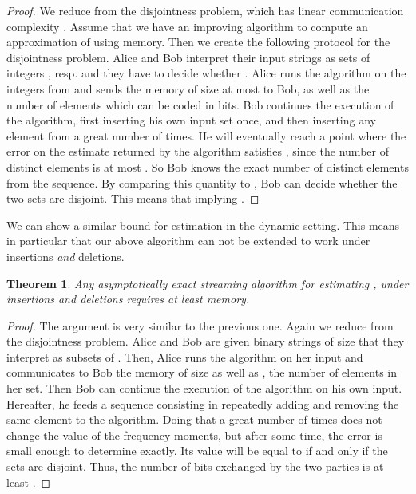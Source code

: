 \documentclass[a4paper,11pt,oneside,english,onecolumn]{article}
\newtheorem{theorem}{Theorem}
\theoremstyle{definition}
\begin{document}
\begin{proof}
We reduce from the disjointness problem, which has linear communication complexity \cite{Disjointness}. Assume that we have an improving algorithm  to compute an approximation of  using  memory. Then we create the following protocol for the disjointness problem. Alice and Bob interpret their input strings  as sets of integers , resp.  and they have to decide whether . Alice runs the algorithm on the integers from  and sends the memory of size at most  to Bob, as well as the number of elements  which can be coded in  bits. Bob continues the execution of the algorithm, first inserting his own input set  once, and then inserting any element from  a great number of times. He will eventually reach a point where the error on the estimate  returned by the algorithm satisfies , since the number of distinct elements is at most . So Bob knows the exact number of distinct elements from the sequence. By comparing this quantity to , Bob can decide whether the two sets are disjoint. This means that  implying .
\end{proof}

We can show a similar bound for  estimation in the dynamic setting. This means in particular that our above algorithm can not be extended to work under insertions \emph{and} deletions.

\begin{theorem}
\label{lem:fk}
Any asymptotically exact streaming algorithm for estimating ,  under insertions and deletions requires at least  memory.
\end{theorem}

\begin{proof}
The argument is very similar to the previous one. Again we reduce from the disjointness problem. Alice and Bob are given binary strings of size  that they interpret as subsets of . Then, Alice runs the algorithm on her input and communicates to Bob the memory of size  as well as , the number of elements in her set. Then Bob can continue the execution of the algorithm on his own input. Hereafter, he feeds a sequence consisting in repeatedly adding and removing the same element to the algorithm. Doing that a great number of times does not change the value of the frequency moments, but after some time, the error is small enough to determine  exactly. Its value will be equal to  if and only if the sets are disjoint. Thus, the number of bits exchanged by the two parties is at least .
\end{proof}
\end{document}
